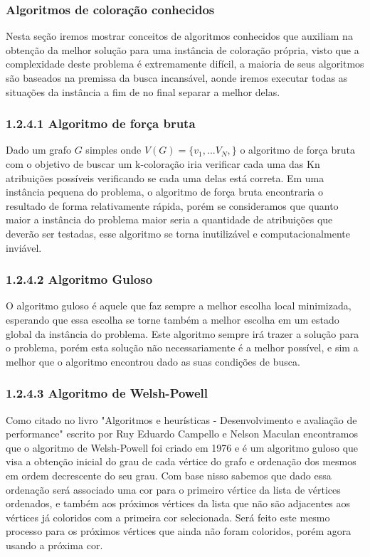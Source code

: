 \documentclass[12pt]{article}
\begin{document}
	\subsubsection{Algoritmos de coloração conhecidos}
	
	Nesta seção iremos mostrar conceitos de algoritmos conhecidos que auxiliam na obtenção da melhor solução para uma instância de coloração própria, visto que a complexidade deste problema é extremamente difícil, a maioria de seus algoritmos são baseados na premissa da busca incansável, aonde iremos executar todas as situações da instância a fim de no final separar a melhor delas.
	
	\subsubsection*{1.2.4.1 Algoritmo de força bruta}
	Dado um grafo $G$ simples onde $V(G) = \{v_{1}, ... V_{N},\}$ o algoritmo de força bruta com o objetivo de buscar um k-coloração iria verificar cada uma das Kn atribuições possíveis verificando se cada uma delas está correta. Em uma instância pequena do problema, o algoritmo de força bruta encontraria o resultado de forma relativamente rápida, porém se consideramos que quanto maior a instância do problema maior seria a quantidade de atribuições que deverão ser testadas, esse algoritmo se torna inutilizável e computacionalmente inviável.
	
	\subsubsection*{1.2.4.2 Algoritmo Guloso}
	
	O algoritmo guloso é aquele que faz sempre a melhor escolha local minimizada, esperando que essa escolha se torne também a melhor escolha em um estado global da instância do problema.
	Este algoritmo sempre irá trazer a solução para o problema, porém esta solução não necessariamente é a melhor possível, e sim a melhor que o algoritmo encontrou dado as suas condições de busca.
	
	
	\subsubsection*{1.2.4.3 Algoritmo de Welsh-Powell}
	
	Como citado no livro "Algoritmos e heurísticas - Desenvolvimento e avaliação de performance" escrito por Ruy Eduardo Campello e Nelson Maculan encontramos que o algoritmo de Welsh-Powell foi criado em 1976 e é um algoritmo guloso que visa a obtenção inicial do grau de cada vértice do grafo e ordenação dos mesmos em ordem decrescente do seu grau. Com base nisso sabemos que dado essa ordenação será associado uma cor para o primeiro vértice da lista de vértices ordenados, e também aos próximos vértices da lista que não são adjacentes aos vértices já coloridos com a primeira cor selecionada. Será feito este mesmo processo para os próximos vértices que ainda não foram coloridos, porém agora usando a próxima cor.
	
\end{document}
